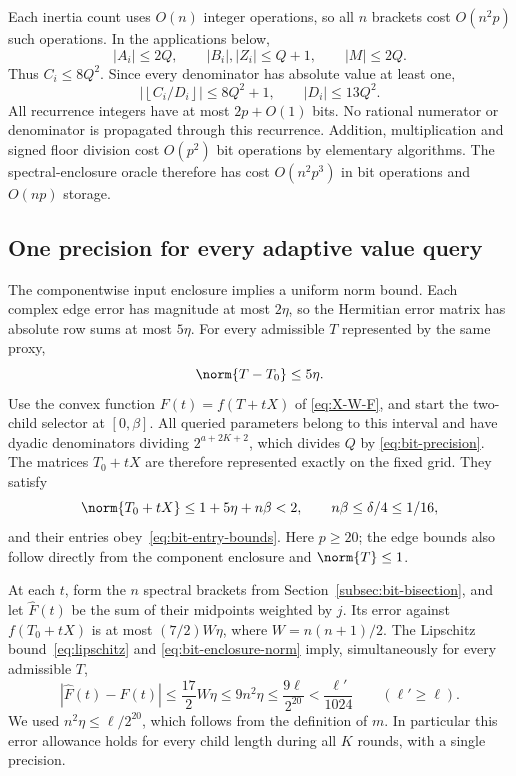 Each inertia count uses $O(n)$ integer operations, so all $n$
brackets cost $O(n^2p)$ such operations. In the applications below,
\begin{equation}\label{eq:bit-entry-bounds}
 |A_i|\leq2Q,\qquad |B_i|,|Z_i|\leq Q+1,
 \qquad |M|\leq2Q.
\end{equation}
Thus $C_i\leq8Q^2$. Since every denominator has absolute value at
least one,
\[
 \left|\left\lfloor C_i/D_i\right\rfloor\right|
       \leq8Q^2+1,\qquad |D_i|\leq13Q^2.
\]
All recurrence integers have at most $2p+O(1)$ bits. No rational
numerator or denominator is propagated through this recurrence.
Addition, multiplication and signed floor division cost $O(p^2)$
bit operations by elementary algorithms. The spectral-enclosure
oracle therefore has cost $O(n^2p^3)$ in bit operations and
$O(np)$ storage.

\subsection{One precision for every adaptive value query}
\label{subsec:bit-values}

The componentwise input enclosure implies a uniform norm bound.
Each complex edge error has magnitude at most $2\eta$, so the
Hermitian error matrix has absolute row sums at most $5\eta$.
For every admissible $T$ represented by the same proxy,
\begin{equation}\label{eq:bit-enclosure-norm}
 \norm{T-T_0}\leq5\eta.
\end{equation}
Use the convex function $F(t)=f(T+tX)$ of
\eqref{eq:X-W-F}, and start the two-child selector at $[0,\beta]$.
All queried parameters belong to this interval and have dyadic
denominators dividing $2^{a+2K+2}$, which divides $Q$ by
\eqref{eq:bit-precision}. The matrices $T_0+tX$ are therefore
represented exactly on the fixed grid. They satisfy
\[
 \norm{T_0+tX}\leq1+5\eta+n\beta<2,
 \qquad n\beta\leq\delta/4\leq1/16,
\]
and their entries obey~\eqref{eq:bit-entry-bounds}. Here $p\geq20$;
the edge bounds also follow directly from the component enclosure
and $\norm{T}\leq1$.

At each $t$, form the $n$ spectral brackets from
Section~\ref{subsec:bit-bisection}, and let $\widehat F(t)$ be the
sum of their midpoints weighted by $j$. Its error against
$f(T_0+tX)$ is at most $(7/2)W\eta$, where $W=n(n+1)/2$.
The Lipschitz bound~\eqref{eq:lipschitz} and
\eqref{eq:bit-enclosure-norm} imply, simultaneously for every
admissible $T$,
\begin{equation}\label{eq:bit-value-error}
 |\widehat F(t)-F(t)|
 \leq\frac{17}{2}W\eta
 \leq9n^2\eta
 \leq\frac{9\ell}{2^{20}}
 <\frac{\ell'}{1024}
 \qquad(\ell'\geq\ell).
\end{equation}
We used $n^2\eta\leq\ell/2^{20}$, which follows from the
definition of $m$. In particular this error allowance holds for
every child length during all $K$ rounds, with a single precision.

